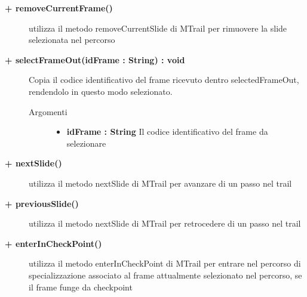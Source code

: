 \begin{description}
	\begin{description}
		\item[\textbf{\color{blue}+ removeCurrentFrame()			}] \hfill
			utilizza il metodo removeCurrentSlide di MTrail per rimuovere la slide selezionata nel percorso
	\end{description}
	
	\begin{description}
		\item[\textbf{\color{blue}+ selectFrameOut(idFrame : String) : void			}] \hfill
			Copia il codice identificativo del frame ricevuto dentro selectedFrameOut, rendendolo in questo modo selezionato.
			
		\begin{description}
			\item[Argomenti] \hfill
				\begin{itemize}
				
					\item \textbf{idFrame : String			} \hfill
					Il codice identificativo del frame da selezionare
					
				\end{itemize}
			
		\end{description}
	\end{description}
	
	\begin{description}
		\item[\textbf{\color{blue}+ nextSlide()			}] \hfill
			utilizza il metodo nextSlide di MTrail per avanzare di un passo nel trail
	\end{description}
	
	\begin{description}
		\item[\textbf{\color{blue}+ previousSlide()			}] \hfill
			utilizza il metodo nextSlide di MTrail per retrocedere di un passo nel trail
	\end{description}
	
	\begin{description}
		\item[\textbf{\color{blue}+ enterInCheckPoint()			}] \hfill
			utilizza il metodo enterInCheckPoint di MTrail per entrare nel percorso di specializzazione associato al frame attualmente selezionato nel percorso, se il frame funge da checkpoint
	\end{description}
	

\end{description}
